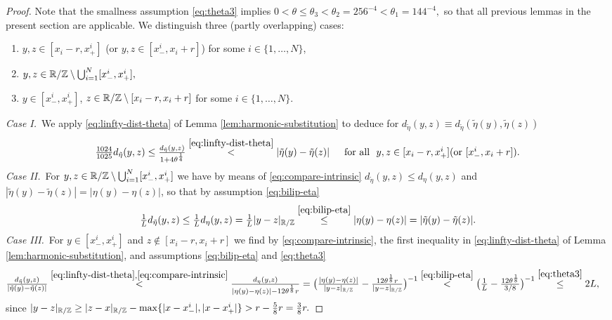 \begin{proof}
Note that the smallness assumption \eqref{eq:theta3} implies
$0<\theta\le\theta_3<\theta_2=256^{-4}<\theta_1=144^{-4},$ so that
all previous lemmas in the present section are applicable. We
distinguish three (partly overlapping) cases:
\begin{enumerate}
\item[\rm I.] $y,z\in [x_i-r,x_+^i]$ (or $y,z\in [x^i_-,x_i+r]$) for some 
$i\in\{1,\ldots,N\}$,
\item[\rm II.] $y,z\in\mathbb{R}/\mathbb{Z}\setminus \bigcup_{i=1}^N[x_-^i,x_+^i],$
\item[\rm III.] $y\in [x_-^i,x_+^i]$, $z\in\mathbb{R}/\mathbb{Z}\setminus
[x_i-r,x_i+r]$ for some $i\in\{1,\ldots,N\}$.
\end{enumerate}
\noindent
{\it Case I.}\,
We apply \eqref{eq:linfty-dist-theta} of Lemma 
\ref{lem:harmonic-substitution} to deduce for $d_{\tilde{\eta}}(y,z)\equiv
d_{\tilde{\eta}}(\tilde{\eta}(y),\tilde{\eta}(z))$
\begin{equation}\label{eq:bilip-tilde1}
\textstyle
\frac{1024}{1025}d_{\tilde{\eta}}(y,z)\le
\frac{d_{\tilde{\eta}}(y,z)}{1+4\theta^\frac14}\overset{\eqref{eq:linfty-dist-theta}}{<}|\tilde{\eta}(y)-\tilde{\eta}(z)|\quad\,\,\,\text{for all }\,\, y,z\in [x_i-r,x_+^i]
(\textnormal{or $[x_-^i,x_i+r]$}).
\end{equation}
\noindent
{\it Case II.}\,
For $y,z\in\mathbb{R}/\mathbb{Z}\setminus \bigcup_{i=1}^N[x_-^i,x_+^i]$ we have by 
means of \eqref{eq:compare-intrinsic} $d_{\tilde{\eta}}(y,z)
\le d_\eta(y,z)$ and $|\tilde{\eta}(y)-\tilde{\eta}(z)|=|\eta(y)-\eta(z)|$,
so that by assumption \eqref{eq:bilip-eta} 
\begin{equation}\label{eq:bilip-tilde2}
\textstyle
\frac1{L}d_{\tilde{\eta}}(y,z)\le
\frac1{L}d_{\eta}(y,z)=\frac1{L}|y-z|_{\mathbb{R}/\mathbb{Z}}
\overset{\eqref{eq:bilip-eta}}{\le}
|\eta(y)-\eta(z)|=
|\tilde{\eta}(y)-\tilde{\eta}(z)|.
\end{equation}
\noindent
{\it Case III.}\,
For $y\in [x_-^i,x_+^i]$ and $z\notin [x_i-r,x_i+r]$ we find by
\eqref{eq:compare-intrinsic}, the first inequality in
\eqref{eq:linfty-dist-theta} of Lemma \ref{lem:harmonic-substitution},
and
assumptions \eqref{eq:bilip-eta} and \eqref{eq:theta3}
\begin{align}
\textstyle\frac{d_{\tilde{\eta}}(y,z)}{|\tilde{\eta}(y)-\tilde{\eta}(z)|}&
\textstyle
\stackrel{\eqref{eq:linfty-dist-theta}, \eqref{eq:compare-intrinsic}}{<}
\frac{d_{\eta}(y,z)}{|\eta(y)-\eta(z)|-12\theta^\frac18 r}=\big(
\frac{|\eta(y)-\eta(z)|}{|y-z|_{\mathbb{R}/\mathbb{Z}}}-\frac{12\theta^\frac18
r}{
|y-z|_{\mathbb{R}/\mathbb{Z}}}\big)^{-1}\overset{\eqref{eq:bilip-eta}}{<}
\big(\frac1{L}-\frac{12\theta^\frac18}{3/8}\big)^{-1}
\overset{\eqref{eq:theta3}}{\le}2L,
\end{align}
since $|y-z|_{\mathbb{R}/\mathbb{Z}}\ge |z-x|_{\mathbb{R}/\mathbb{Z}}-\max\{|x-x_-^i|,
|x-x_+^i|\}
>r-\frac58 r=\frac38 r.$
\end{proof}
